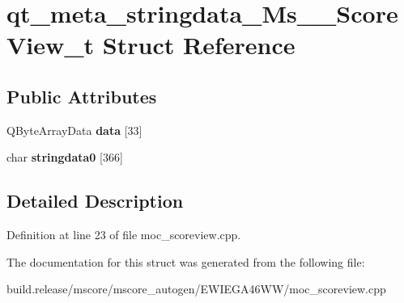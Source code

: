 \hypertarget{structqt__meta__stringdata___ms_____score_view__t}{}\section{qt\+\_\+meta\+\_\+stringdata\+\_\+\+Ms\+\_\+\+\_\+\+Score\+View\+\_\+t Struct Reference}
\label{structqt__meta__stringdata___ms_____score_view__t}
\subsection*{Public Attributes}
\begin{DoxyCompactItemize}
\item 
\mbox{\label{structqt__meta__stringdata___ms_____score_view__t_a5954779c9f2c6974821b7a5f70684f3d}} 
Q\+Byte\+Array\+Data {\bfseries data} \mbox{[}33\mbox{]}
\item 
\mbox{\label{structqt__meta__stringdata___ms_____score_view__t_a981885981efc419e959e59ab9cb016dd}} 
char {\bfseries stringdata0} \mbox{[}366\mbox{]}
\end{DoxyCompactItemize}


\subsection{Detailed Description}


Definition at line 23 of file moc\+\_\+scoreview.\+cpp.



The documentation for this struct was generated from the following file\+:\begin{DoxyCompactItemize}
\item 
build.\+release/mscore/mscore\+\_\+autogen/\+E\+W\+I\+E\+G\+A46\+W\+W/moc\+\_\+scoreview.\+cpp\end{DoxyCompactItemize}
